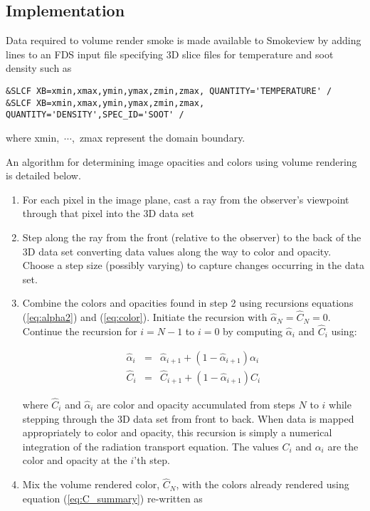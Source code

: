 {\subsection{Implementation}
Data required to volume render smoke is made available to
Smokeview by adding lines to an FDS input file specifying 3D slice
files for temperature and soot density such as
\begin{lstlisting}
&SLCF XB=xmin,xmax,ymin,ymax,zmin,zmax, QUANTITY='TEMPERATURE' /
&SLCF XB=xmin,xmax,ymin,ymax,zmin,zmax, QUANTITY='DENSITY',SPEC_ID='SOOT' /
\end{lstlisting}
where xmin,~$\cdots$,~zmax represent the domain boundary.

An algorithm for determining image opacities and colors using
volume rendering is detailed below.

\begin{enumerate}

\item For each pixel in the image plane, cast a ray from the
observer's viewpoint through that pixel into the 3D data set

\item Step along the ray from the front (relative to the observer)
to the back of the 3D data set converting data values along the
way to color and opacity.  Choose a step size (possibly varying)
to capture changes occurring in the data set.

\item Combine the colors and opacities found in step 2 using
recursions equations (\ref{eq:alpha2}) and (\ref{eq:color}).
Initiate the recursion with $\hat{\alpha}_{N}=\hat{C}_{N}=0$.
Continue the recursion for $i=N-1$ to $i=0$ by computing
$\hat{\alpha}_i$ and $\hat{C}_i$ using:

\begin{eqnarray}
\hat{\alpha}_i&=&\hat{\alpha}_{i+1}+\left(1-\hat{\alpha}_{i+1}\right)\alpha_i\\
\hat{C}_i&=&\hat{C}_{i+1}+\left(1-\hat{\alpha}_{i+1}\right)C_i
\end{eqnarray}

where $\hat{C}_i$ and $\hat{\alpha}_i$ are color and opacity
accumulated from steps $N$ to $i$ while stepping through the 3D
data set from front to back.  When data is mapped appropriately to
color and opacity, this recursion is simply a numerical
integration of the radiation transport equation. The values $C_i$
and $\alpha_i$ are the color and opacity at the $i$'th step.

\item Mix the volume rendered color, $\hat{C}_N$, with the colors
already rendered using equation (\ref{eq:C_summary}) re-written as


\end{enumerate}}
